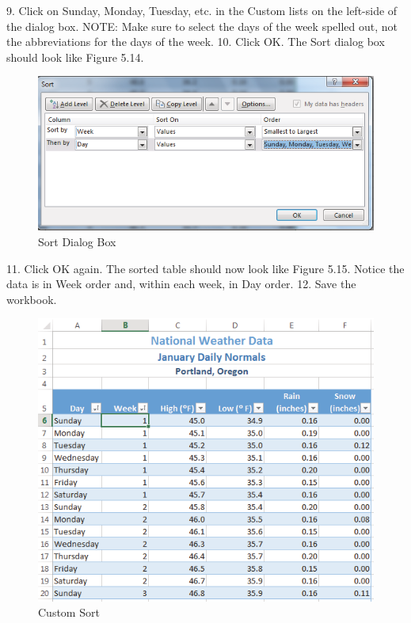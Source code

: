 9. Click on Sunday, Monday, Tuesday, etc. in the Custom lists on the left-side of the dialog box.
NOTE: Make sure to select the days of the week spelled out, not the abbreviations for the days
of the week.
10. Click OK. The Sort dialog box should look like Figure 5.14.


\begin{figure}[H]
	\centering
	\includegraphics[width=\maxwidth{.95\linewidth}]{gfx/ch05_fig14}
	\caption{Sort Dialog Box}
	\label{05:fig14}
\end{figure}





11. Click OK again. The sorted table should now look like Figure 5.15. Notice the data is in Week
order and, within each week, in Day order.
12. Save the workbook.


\begin{figure}[H]
	\centering
	\includegraphics[width=\maxwidth{.95\linewidth}]{gfx/ch05_fig15}
	\caption{Custom Sort}
	\label{05:fig15}
\end{figure}


